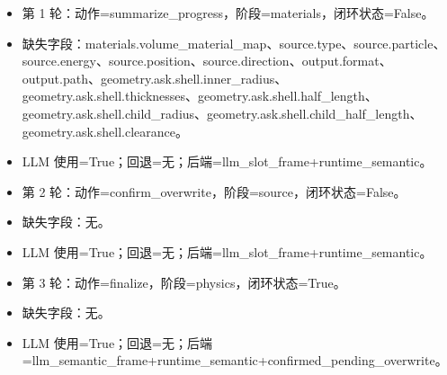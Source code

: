 \documentclass[11pt]{ctexart}
\begin{document}
\begin{itemize}
\item 第 1 轮：动作=summarize\_progress，阶段=materials，闭环状态=False。
\item 缺失字段：materials.volume\_material\_map、source.type、source.particle、source.energy、source.position、source.direction、output.format、output.path、geometry.ask.shell.inner\_radius、geometry.ask.shell.thicknesses、geometry.ask.shell.half\_length、geometry.ask.shell.child\_radius、geometry.ask.shell.child\_half\_length、geometry.ask.shell.clearance。
\item LLM 使用=True；回退=无；后端=llm\_slot\_frame+runtime\_semantic。
\item 第 2 轮：动作=confirm\_overwrite，阶段=source，闭环状态=False。
\item 缺失字段：无。
\item LLM 使用=True；回退=无；后端=llm\_slot\_frame+runtime\_semantic。
\item 第 3 轮：动作=finalize，阶段=physics，闭环状态=True。
\item 缺失字段：无。
\item LLM 使用=True；回退=无；后端=llm\_semantic\_frame+runtime\_semantic+confirmed\_pending\_overwrite。
\end{itemize}
\end{document}
